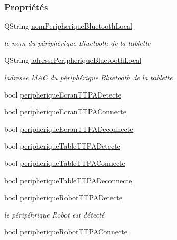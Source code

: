 \subsubsection*{Propriétés}
\begin{DoxyCompactItemize}
\item 
Q\+String \hyperlink{class_communication_bluetooth_a6781eed73c4b5db0fe7ff94c034f2cf5}{nom\+Peripherique\+Bluetooth\+Local}
\begin{DoxyCompactList}\small\item\em le nom du périphérique Bluetooth de la tablette \end{DoxyCompactList}\item 
Q\+String \hyperlink{class_communication_bluetooth_a972265a71842606740b53560a7fc0e53}{adresse\+Peripherique\+Bluetooth\+Local}
\begin{DoxyCompactList}\small\item\em l\textquotesingle{}adresse M\+AC du périphérique Bluetooth de la tablette \end{DoxyCompactList}\item 
bool \hyperlink{class_communication_bluetooth_a2027c09adf569761c9a0500ab00f14fa}{peripherique\+Ecran\+T\+T\+P\+A\+Detecte}
\item 
bool \hyperlink{class_communication_bluetooth_ace9f69a994a3e9bbaab18ef48ff0f6a3}{peripherique\+Ecran\+T\+T\+P\+A\+Connecte}
\item 
bool \hyperlink{class_communication_bluetooth_ac08fb857ef766c65aa87a4f3788f4592}{peripherique\+Ecran\+T\+T\+P\+A\+Deconnecte}
\item 
bool \hyperlink{class_communication_bluetooth_a1b4f8cfa7d15ede41c4a6f5c9521e955}{peripherique\+Table\+T\+T\+P\+A\+Detecte}
\item 
bool \hyperlink{class_communication_bluetooth_a3b2e75b95ad66dd46d6b1268694c74dc}{peripherique\+Table\+T\+T\+P\+A\+Connecte}
\item 
bool \hyperlink{class_communication_bluetooth_af19f121ae4dcfe52d4c06893e88cec80}{peripherique\+Table\+T\+T\+P\+A\+Deconnecte}
\item 
bool \hyperlink{class_communication_bluetooth_ac4bf43e3da4748c8fa25e0ac1d3cf849}{peripherique\+Robot\+T\+T\+P\+A\+Detecte}
\begin{DoxyCompactList}\small\item\em le péripéhrique Robot est détecté \end{DoxyCompactList}\item 
bool \hyperlink{class_communication_bluetooth_a451b47553dd5cf716e8825c0fc0c203b}{peripherique\+Robot\+T\+T\+P\+A\+Connecte}

\end{DoxyCompactItemize}
